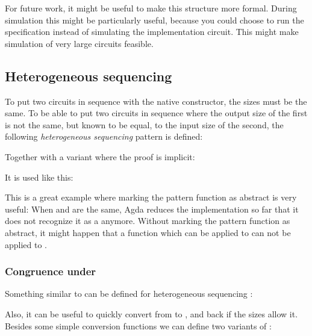 For future work, it might be useful to make this structure more
formal.
During simulation this might be particularly useful, because you could
choose to run the specification instead of simulating the
implementation circuit.
This might make simulation of very large circuits feasible.

\subsection{Heterogeneous sequencing}\label{heterogeneous-sequencing}

To put two circuits in sequence with the native 
constructor, the sizes must be the same.
To be able to put two circuits in sequence where the output size of
the first is not the same, but known to be equal, to the input size of
the second, the following \emph{heterogeneous sequencing} pattern is
defined:


Together with a variant where the proof is implicit:


It is used like this:


This is a great example where marking the pattern function as abstract
is very useful:
When  and  are the same, Agda reduces the implementation
so far that it does not recognize it as a  anymore.
Without marking the pattern function as abstract, it might happen that
a function which can be applied to  \AP{⟫[}  \AP{]} 
can not be applied to  \AP{⟫[}  \AP{]} .


\subsubsection{\texorpdfstring{Congruence under
    }{Congruence under ⟫[]-cong}}\label{cong}

Something similar to  can be defined for heterogeneous
sequencing :


Also, it can be useful to quickly convert from  to , and
back if the sizes allow it.
Besides some simple conversion functions we can define two variants of
:

